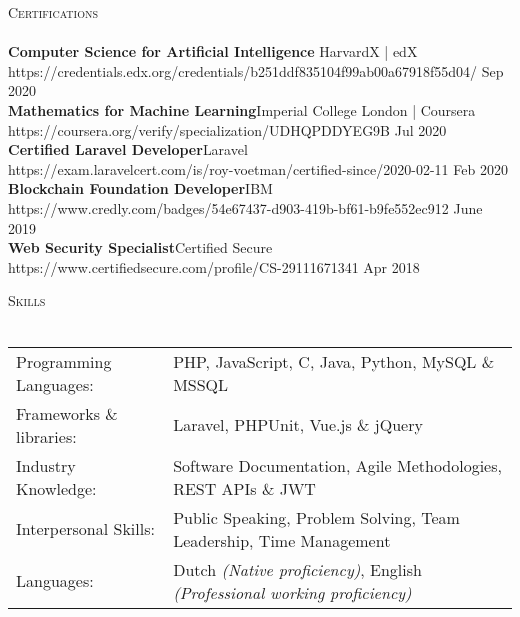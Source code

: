 \documentclass[a4paper]{article}
\newcommand{\lineunder} {
    \vspace*{-8pt} \\
    \hspace*{-18pt} \hrulefill \\
}
\newcommand{\header} [1] {
    {\hspace*{-18pt}\vspace*{6pt} \textsc{#1}}
    \vspace*{-6pt} \lineunder
}
\begin{document}
\newpage

\header{Certifications}
\textbf{Computer Science for Artificial Intelligence }\hfill HarvardX | edX\\
https://credentials.edx.org/credentials/b251ddf835104f99ab00a67918f55d04/ \hfill Sep 2020\\
\vspace{2mm}
\textbf{Mathematics for Machine Learning}\hfill Imperial College London | Coursera\\
https://coursera.org/verify/specialization/UDHQPDDYEG9B \hfill Jul 2020\\
\vspace{2mm}
\textbf{Certified Laravel Developer}\hfill Laravel\\
https://exam.laravelcert.com/is/roy-voetman/certified-since/2020-02-11 \hfill Feb 2020\\
\vspace{2mm}
\textbf{Blockchain Foundation Developer}\hfill IBM\\
https://www.credly.com/badges/54e67437-d903-419b-bf61-b9fe552ec912 \hfill June 2019\\
\vspace{2mm}
\textbf{Web Security Specialist}\hfill Certified Secure\\
https://www.certifiedsecure.com/profile/CS-29111671341 \hfill Apr 2018\\
\vspace{2mm}

\vspace{5mm}

\header{Skills}
\vspace{2mm}
\begin{tabular}{l l}
	Programming Languages:   & PHP, JavaScript, C, Java, Python, MySQL \& MSSQL                     \\
    Frameworks \& libraries: & Laravel, PHPUnit, Vue.js \& jQuery                                   \\
	Industry Knowledge:      & Software Documentation, Agile Methodologies, REST APIs \& JWT    \\
	Interpersonal Skills:    & Public Speaking, Problem Solving, Team Leadership, Time Management \\
    Languages:               & Dutch \emph{(Native proficiency)}, English \emph{(Professional working proficiency)}\\
\end{tabular}
\vspace{2mm}
\end{document}
